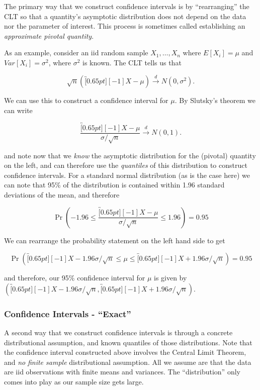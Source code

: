 \documentclass[
  letterpaper,
  DIV=11,
  numbers=noendperiod]{scrreprt}
\begin{document}
The primary way that we construct confidence intervals is by
``rearranging'' the CLT so that a quantity's asymptotic distribution
does not depend on the data nor the parameter of interest. This process
is sometimes called establishing an \emph{approximate pivotal quantity}.

As an example, consider an iid random sample \(X_1, \dots, X_n\) where
\(E[X_i] = \mu\) and \(Var[X_i] = \sigma^2\), where \(\sigma^2\) is
known. The CLT tells us that

\[
\sqrt{n}(\overbracket[0.65pt][-1]{X} - \mu) \overset{d}{\to} N(0, \sigma^2).
\]

We can use this to construct a confidence interval for \(\mu\). By
Slutsky's theorem we can write

\[
\frac{\overbracket[0.65pt][-1]{X} - \mu}{\sigma/\sqrt{n}} \overset{d}{\to} N(0, 1).
\]

and note now that we \emph{know} the asymptotic distribution for the
(pivotal) quantity on the left, and can therefore use the
\emph{quantiles} of this distribution to construct confidence intervals.
For a standard normal distribution (as is the case here) we can note
that 95\% of the distribution is contained within 1.96 standard
deviations of the mean, and therefore

\[
\Pr\left(-1.96 \leq \frac{\overbracket[0.65pt][-1]{X} - \mu}{\sigma/\sqrt{n}} \leq 1.96\right) = 0.95
\]

We can rearrange the probability statement on the left hand side to get

\[
\Pr\left(\overbracket[0.65pt][-1]{X}-1.96 \sigma/\sqrt{n} \leq \mu \leq \overbracket[0.65pt][-1]{X} + 1.96\sigma/\sqrt{n}\right) = 0.95
\]

and therefore, our 95\% confidence interval for \(\mu\) is given by
\(\left( \overbracket[0.65pt][-1]{X}-1.96 \sigma/\sqrt{n}, \overbracket[0.65pt][-1]{X}+1.96 \sigma/\sqrt{n} \right)\).

\hypertarget{confidence-intervals---exact}{%
\subsubsection*{Confidence Intervals -
``Exact''}\label{confidence-intervals---exact}}

A second way that we construct confidence intervals is through a
concrete distributional assumption, and known quantiles of those
distributions. Note that the confidence interval constructed above
involves the Central Limit Theorem, and \emph{no} \emph{finite sample}
distributional assumption. All we assume are that the data are iid
observations with finite means and variances. The ``distribution'' only
comes into play as our sample size gets large.
\end{document}
